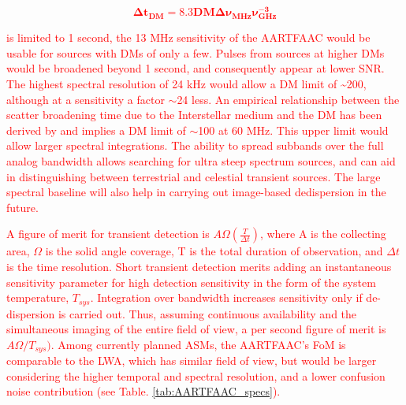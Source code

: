 \documentclass{aa}
\begin{document}
\textcolor{red}{
\begin{equation}
\mathbf{\Delta t_{DM}=8.3DM\Delta\nu_{MHz}\nu_{GHz}^{-3}}\label{eq:datamodel-1}
\end{equation}
}

\textcolor{red}{is limited to 1 second, the 13 MHz sensitivity of
the AARTFAAC would be usable for sources with DMs of only a few. Pulses
from sources at higher DMs would be broadened beyond 1 second, and
consequently appear at lower SNR. The highest spectral resolution
of 24 kHz would allow a DM limit of \textasciitilde{}200, although
at a sensitivity a factor $\sim$24 less. An empirical relationship
between the scatter broadening time due to the Interstellar medium
and the DM has been derived by \citep{bhat2004multifrequency} and
implies a DM limit of $\sim$100 at 60 MHz. This upper limit would
allow larger spectral integrations. The ability to spread subbands
over the full analog bandwidth allows searching for ultra steep spectrum
sources, and can aid in distinguishing between terrestrial and celestial
transient sources. The large spectral baseline will also help in carrying
out image-based dedispersion in the future.}

\textcolor{red}{A figure of merit for transient detection\citep{cordes2004dynamic}
is $A\Omega\left(\frac{T}{\Delta t}\right)$, where A is the collecting
area, $\Omega$ is the solid angle coverage, T is the total duration
of observation, and $\Delta t$ is the time resolution. Short transient
detection merits adding an instantaneous sensitivity parameter for
high detection sensitivity in the form of the system temperature,
$T_{sys}$. Integration over bandwidth increases sensitivity only
if de-dispersion is carried out. Thus, assuming continuous availability
and the simultaneous imaging of the entire field of view, a per second
figure of merit is $A\Omega/T_{sys})$. Among currently planned ASMs,
the AARTFAAC's FoM is comparable to the LWA, which has similar field
of view, but would be larger considering the higher temporal and spectral
resolution, and a lower confusion noise contribution (see Table. \ref{tab:AARTFAAC_specs}). }
\end{document}
